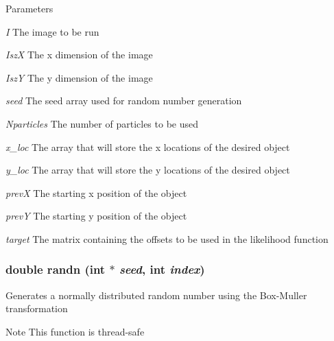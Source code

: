 \begin{DoxyParams}{Parameters}
\item[{\em I}]The image to be run \item[{\em IszX}]The x dimension of the image \item[{\em IszY}]The y dimension of the image \item[{\em seed}]The seed array used for random number generation \item[{\em Nparticles}]The number of particles to be used \item[{\em x\_\-loc}]The array that will store the x locations of the desired object \item[{\em y\_\-loc}]The array that will store the y locations of the desired object \item[{\em prevX}]The starting x position of the object \item[{\em prevY}]The starting y position of the object \item[{\em target}]The matrix containing the offsets to be used in the likelihood function \end{DoxyParams}
\hypertarget{ex__particle__CUDA__naive__full_8cu_a4b441b42d0a8b6dc3a2b30db3be1d6b5}{
\subsubsection[{randn}]{\setlength{\rightskip}{0pt plus 5cm}double randn (int $\ast$ {\em seed}, \/  int {\em index})}}
\label{ex__particle__CUDA__naive__full_8cu_a4b441b42d0a8b6dc3a2b30db3be1d6b5}
Generates a normally distributed random number using the Box-\/Muller transformation \begin{DoxyNote}{Note}
This function is thread-\/safe 
\end{DoxyNote}

